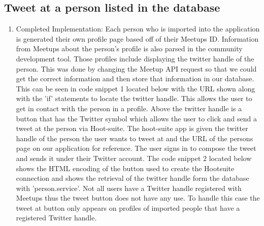 \documentclass[draftclsnofoot,10pt,onecolumn]{IEEEtran} %
\begin{document}
\subsection{Tweet at a person listed in the database}
\begin{enumerate}
  \item Completed Implementation: Each person who is imported into the application
    is generated their own profile page based off of their Meetups ID. Information from 
    Meetups about the person’s profile is also parsed in the community development tool. Those profiles
    include displaying the twitter handle of the person. This was done by changing
    the Meetup API request so that we could get the correct information and
    then store that information in our database. This can be seen in code snippet 1 located below 
    with the URL shown along with the 'if' statements to locate the twitter handle. This allows the user to get 
    in contact with the person in a profile. Above the
    twitter handle is a button that has the Twitter symbol which allows the user
    to click and send a tweet at the person via Hoot-suite. The hoot-suite app is
    given the twitter handle of the person the user wants to tweet at and the URL
    of the persons page on our application for reference. The user signs in to
    compose the tweet and sends it under their Twitter account. The code snippet 2 located below 
    shows the HTML encoding of the button used to create the Hootsuite connection and shows the 
    retrieval of the twitter handle form the database with 'person.service'. Not all users have a
    Twitter handle registered with Meetups thus the tweet button does not have any use. To handle this case
    the tweet at button only appears on profiles of imported people that have a registered Twitter handle.
\end{enumerate}
\fi  

\iffalse
\end{document}
